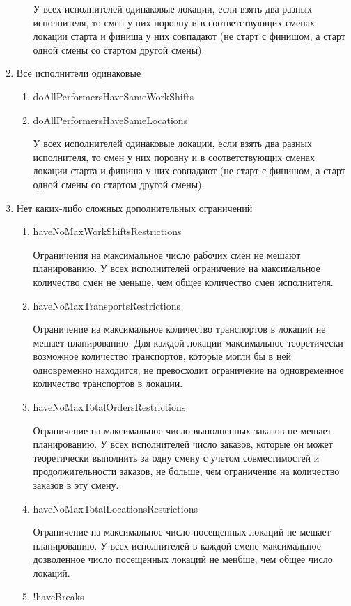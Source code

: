 \begin{enumerate}
\begin{enumerate}
	    У всех исполнителей одинаковые локации, если взять два разных исполнителя, то смен у них поровну и в соответствующих сменах локации старта и финиша у них совпадают (не старт с финишом, а старт одной смены со стартом другой смены).
	    	    
	\end{enumerate}

\item Все исполнители одинаковые
\begin{enumerate}
	\item doAllPerformersHaveSameWorkShifts
	\item doAllPerformersHaveSameLocations
	
	У всех исполнителей одинаковые локации, если взять два разных исполнителя, то смен у них поровну и в соответствующих сменах локации старта и финиша у них совпадают (не старт с финишом, а старт одной смены со стартом другой смены).
	
\end{enumerate}

\item Нет каких-либо сложных дополнительных ограничений

\begin{enumerate}
	\item haveNoMaxWorkShiftsRestrictions
	
	Ограничения на максимальное число рабочих смен не мешают планированию. У всех исполнителей ограничение на максимальное количество смен не меньше, чем общее количество смен исполнителя.
	\item haveNoMaxTransportsRestrictions
	
	Ограничение на максимальное количество транспортов в локации не мешает планированию. Для каждой локации максимальное теоретически возможное количество транспортов, которые могли бы в ней одновременно находится, не превосходит ограничение на одновременное количество транспортов в локации.
	\item haveNoMaxTotalOrdersRestrictions
	
	Ограничение на максимальное число выполненных заказов не мешает планированию. У всех исполнителей число заказов, которые он может теоретически выполнить за одну смену с учетом совместимостей и продолжительности заказов, не больше, чем ограничение на количество заказов в эту смену.
	\item haveNoMaxTotalLocationsRestrictions
	
	Ограничение на максимальное число посещенных локаций не мешает планированию. У всех исполнителей в каждой смене максимальное дозволенное число посещенных локаций не менбше, чем общее число локаций.
	\item !haveBreaks
	

\end{enumerate}
\end{enumerate}
